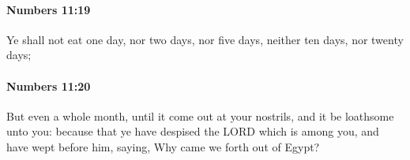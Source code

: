 		\paragraph{Numbers 11:19} %
			\label{NUMBERS-11-19}

			Ye shall not eat one day, nor two days, nor five days, neither ten days, nor twenty days;


		\paragraph{Numbers 11:20} %
			\label{NUMBERS-11-20}

			But even a whole month, until it come out at your nostrils, and it be loathsome unto you: because that ye have despised the LORD which is among you, and have wept before him, saying, Why came we forth out of Egypt?



